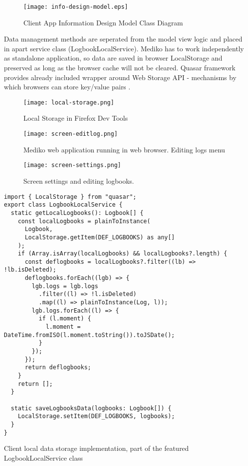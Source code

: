\begin{figure}[H]
    \centering
    \texttt{[image: info-design-model.eps]}
    \caption[Class Diagram]{\label{fig:infomodeldiagram} Client App Information Design Model Class Diagram }
\end{figure}

Data management methods are seperated from the model view logic and placed in apart service class  (LogbookLocalService). Mediko has to work independently as standalone application, so data are saved in browser LocalStorage and preserved as long as the browser cache will not be cleared. Quasar framework provides already included wrapper around Web Storage API - mechanisms by which browsers can store key/value pairs \autocite{MozillaLocalStorage}.

\begin{figure}[H]
    \centering
    \texttt{[image: local-storage.png]}
    \caption[LocalStorage]{\label{fig:localstorage} Local Storage in Firefox Dev Tools }
\end{figure}

\begin{figure}[H]
    \centering
    \texttt{[image: screen-editlog.png]}
    \caption[Editing Log in Web Browser]{\label{fig:editlogs} Mediko web application running in web browser. Editing logs menu }
\end{figure}


\begin{figure}[H]
    \centering
    \texttt{[image: screen-settings.png]}
    \caption[Screen settings]{\label{fig:settings} Screen settings and editing logbooks. }
\end{figure}

    

\begin{listing}[H]
    \begin{verbatim}
import { LocalStorage } from "quasar";
export class LogbookLocalService {
  static getLocalLogbooks(): Logbook[] {
    const localLogbooks = plainToInstance(
      Logbook,
      LocalStorage.getItem(DEF_LOGBOOKS) as any[]
    );
    if (Array.isArray(localLogbooks) && localLogbooks?.length) {
      const deflogbooks = localLogbooks?.filter((lb) => !lb.isDeleted);
      deflogbooks.forEach((lgb) => {
        lgb.logs = lgb.logs
          .filter((l) => !l.isDeleted)
          .map((l) => plainToInstance(Log, l));
        lgb.logs.forEach((l) => {
          if (l.moment) {
            l.moment = DateTime.fromISO(l.moment.toString()).toJSDate();
          }
        });
      });
      return deflogbooks;
    }
    return [];
  }

  static saveLogbooksData(logbooks: Logbook[]) {
    LocalStorage.setItem(DEF_LOGBOOKS, logbooks);
  }
}
    \end{verbatim}
\caption[Logbook Local Service]{Client local data storage implementation, part of the featured LogbookLocalService class}
\end{listing}




